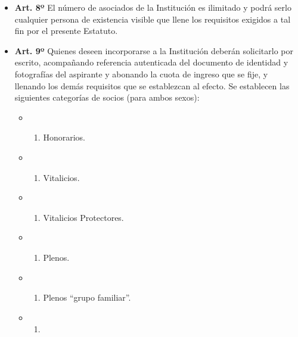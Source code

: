\documentclass[]{book}
\providecommand{\tightlist}{%
  \setlength{\itemsep}{0pt}\setlength{\parskip}{0pt}}
\begin{document}
\begin{itemize}
\item
  \textbf{Art. 8º} El número de asociados de la Institución es ilimitado
  y podrá serlo cualquier persona de existencia visible que llene los
  requisitos exigidos a tal fin por el presente Estatuto.
\item
  \textbf{Art. 9º} Quienes deseen incorporarse a la Institución deberán
  solicitarlo por escrito, acompañando referencia autenticada del
  documento de identidad y fotografías del aspirante y abonando la cuota
  de ingreso que se fije, y llenando los demás requisitos que se
  establezcan al efecto. Se establecen las siguientes categorías de
  socios (para ambos sexos):

  \begin{itemize}
  \item
    \begin{enumerate}
    \def\labelenumi{\alph{enumi})}
    \tightlist
    \item
      Honorarios.
    \end{enumerate}
  \item
    \begin{enumerate}
    \def\labelenumi{\alph{enumi})}
    \setcounter{enumi}{1}
    \tightlist
    \item
      Vitalicios.
    \end{enumerate}
  \item
    \begin{enumerate}
    \def\labelenumi{\alph{enumi})}
    \setcounter{enumi}{2}
    \tightlist
    \item
      Vitalicios Protectores.
    \end{enumerate}
  \item
    \begin{enumerate}
    \def\labelenumi{\alph{enumi})}
    \setcounter{enumi}{3}
    \tightlist
    \item
      Plenos.
    \end{enumerate}
  \item
    \begin{enumerate}
    \def\labelenumi{\alph{enumi})}
    \setcounter{enumi}{4}
    \tightlist
    \item
      Plenos ``grupo familiar''.
    \end{enumerate}
  \item
    \begin{enumerate}
    \def\labelenumi{\alph{enumi})}
    \setcounter{enumi}{5}
    \tightlist
    \item

\end{enumerate}
\end{itemize}
\end{itemize}
\end{document}
